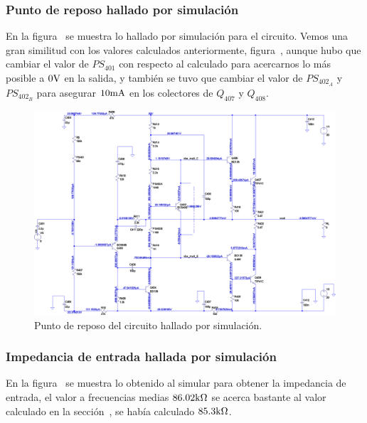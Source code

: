 \vspace{1.5cm}

\clearpage

\subsubsection{Punto de reposo hallado por simulación}

En la figura~ se muestra lo hallado por simulación para el circuito. Vemos una gran similitud con los valores calculados anteriormente, figura~, aunque hubo que cambiar el valor de $PS_{401}$ con respecto al calculado para acercarnos lo más posible a $0 \si[per-mode=symbol]{\volt}$ en la salida, y también se tuvo que cambiar el valor de $PS_{402_{A}}$ y $PS_{402_{B}}$ para asegurar $10 \si[per-mode=symbol]{\milli\ampere}$ en los colectores de $Q_{407}$ y $Q_{408}$.


\begin{figure}[H] %
\begin{center}
\includegraphics[width=0.9 \textwidth, angle=90]{./img/circuitos_usados/P1_P11a_qpoint.png}
\caption{\label{fig:fig_simulated_qpoint}\footnotesize{Punto de reposo del circuito hallado por simulación.}}
\end{center}
\end{figure}


\clearpage

\subsubsection{Impedancia de entrada hallada por simulación}

En la figura~ se muestra lo obtenido al simular para obtener la impedancia de entrada, el valor a frecuencias medias $86.02 \si[per-mode=symbol]{\kilo\ohm}$ se acerca bastante al valor calculado en la sección~, se había calculado $85.3 \si[per-mode=symbol]{\kilo\ohm}$.


